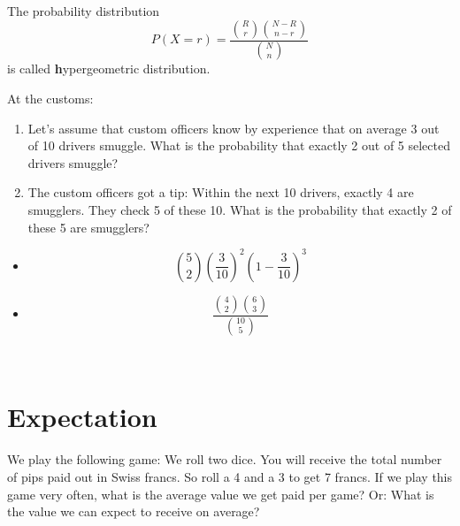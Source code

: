 \documentclass[twoside,11pt,a4paper]{article}
\newif\ifEN \ENtrue	                %
\def\tr|#1|#2|{\ifEN #2\else #1\fi}     %
\newenvironment{ttile}[1]{\begin{tcolorbox}[colback=tile,sharp corners,title=#1]}{\end{tcolorbox}}
\def\vsp{\vspace{5mm}}
\theoremstyle{definition}
\newcounter{exc}
\def\answerline#1{%
   \ifhmode\\[1ex]\fcolorbox{solbox}{solbox}{\hbox to \linewidth{\vbox to #1\baselineskip{}}}%
   \else\fcolorbox{solbox}{solbox}{\hbox to \linewidth{\vbox to #1\baselineskip{}}}%
   \fi
 }
\begin{document}
\par\bigskip
\begin{ttile}{\tr|Hypergeometrische Verteilung|Hypergeometric Distribution|}
 \tr|Die Wahrscheinlichkeitsverteilung |The probability distribution | 
\[
P(X=r)=\frac{\binom Rr \binom {N-R}{n-r}}{\binom Nn}
\]
\tr|heisst \textbf{hypergeometrische Verteilung}. |is called \textbf{hypergeometric distribution}.|  
\end{ttile}
\par\vfil
\newpage
\begin{xxwrap}
\begin{exc}
 \tr|Am Zoll:|At the customs:|
 \begin{enumerate}
 \item \tr|Nehmen wir an, Zöllner wissen aus Erfahrung, dass im Schnitt 3 von 10 Fahrern schmuggeln. Wie gross ist die Wahrscheinlichkeit, dass von 5 kontrollierten 
   Fahrern genau 2 schmuggeln.
   |Let's assume that custom officers know by experience that on average 3 out of 10 drivers smuggle. What is the probability that exactly 2 out of 5 selected drivers smuggle? | 
\item \tr|Aufgrund eines Tipps wissen die Zöllner, dass von den nächsten 10 Fahrern tatsächlich genau 4 schmuggeln. Sie kontrollieren 5 der 10 Fahrer. 
Wie gross ist die Wahrscheinlichkeit, dass genau 2 dieser 5 schmuggeln?
|The custom officers got a tip: Within the next 10 drivers, exactly 4 are smugglers. They check 5 of these 10.  What is the probability that exactly 2 of these 5 are smugglers?|
 \end{enumerate}
\end{exc}
\begin{Answer}
  \begin{itemize}
  \item
    \[
      \binom 52\left(\frac3{10}\right)^2\left(1-\frac3{10}\right)^3
    \]
  \item
    \[
      \frac{\binom 42 \binom {6}{3}}{\binom{10}5}
    \]
  \end{itemize}
\newpage
\end{Answer}
\answerline{20}
\end{xxwrap}

\newpage
\section{\tr|Erwartungwert|Expectation|}
\tr|Wir spielen das folgende Spiel: Sie werfen 2 Würfel und Sie erhalten die Augenzahl in Franken ausbezahlt. Würfeln Sie also eine 4 und eine 3, so bekommen Sie 7 Franken. 
Wenn wir dieses Spiel nun sehr oft spielen, wieviel gewinnen Sie durchschnittlich pro Spiel? Oder anders gefragt, welchen Gewinn pro Spiel können Sie erwarten?
|We play the following game: We roll two dice. You will receive the total number of pips paid out in Swiss francs. So roll a 4 and a 3 to get 7 francs. 
If we play this game very often, what is the average value we get paid per game? Or: What is the value we can expect to receive on average?|
\vsp\vsp
\end{document}

